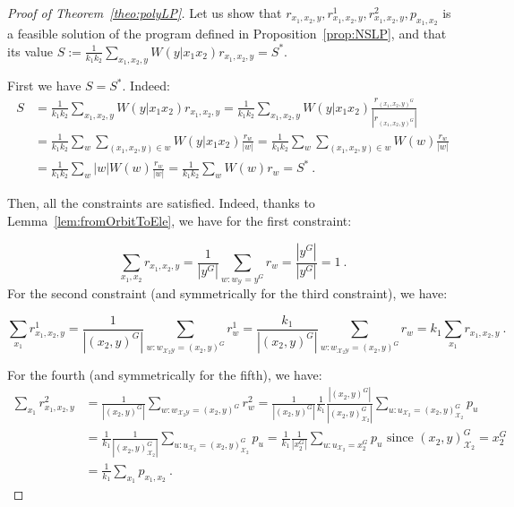 \documentclass[11pt]{article}
\theoremstyle{definition}
\theoremstyle{remark}
\begin{document}
\begin{proof}[Proof of Theorem~\ref{theo:polyLP}]
  Let us show that $r_{x_1,x_2,y},r^1_{x_1,x_2,y},r^2_{x_1,x_2,y},p_{x_1,x_2}$ is a feasible solution of the program defined in Proposition~\ref{prop:NSLP}, and that its value $S:=\frac{1}{k_1k_2} \sum_{x_1,x_2,y} W(y|x_1x_2)r_{x_1,x_2,y} = S^*$.

  First we have $S = S^*$. Indeed:
   \begin{equation}
     \begin{aligned}
       S &= \frac{1}{k_1k_2}\sum_{x_1,x_2,y} W(y|x_1x_2) r_{x_1,x_2,y} = \frac{1}{k_1k_2}\sum_{x_1,x_2,y} W(y|x_1x_2) \frac{r_{(x_1,x_2,y)^G}}{|r_{(x_1,x_2,y)^G}|}\\
       &= \frac{1}{k_1k_2}\sum_{w} \sum_{(x_1,x_2,y) \in w} W(y|x_1x_2) \frac{r_w}{|w|} = \frac{1}{k_1k_2}\sum_{w} \sum_{(x_1,x_2,y) \in w} W(w) \frac{r_w}{|w|}\\
       &= \frac{1}{k_1k_2}\sum_{w} |w| W(w) \frac{r_w}{|w|} = \frac{1}{k_1k_2}\sum_{w} W(w)r_w = S^* \ .
     \end{aligned}
  \end{equation}

   Then, all the constraints are satisfied. Indeed, thanks to Lemma~\ref{lem:fromOrbitToEle}, we have for the first constraint:
   
   \[\sum_{x_1,x_2} r_{x_1,x_2,y} = \frac{1}{|y^G|} \sum_{w:w_{\mathcal{Y}}=y^G} r_w = \frac{|y^G|}{|y^G|} = 1 \ .\]
   For the second constraint (and symmetrically for the third constraint), we have:

   \[\sum_{x_1} r^1_{x_1,x_2,y} = \frac{1}{|(x_2,y)^G|} \sum_{w:w_{\mathcal{X}_2\mathcal{Y}}=(x_2,y)^G} r^1_w = \frac{k_1}{|(x_2,y)^G|}\sum_{w:w_{\mathcal{X}_2\mathcal{Y}}=(x_2,y)^G} r_w = k_1 \sum_{x_1} r_{x_1,x_2,y} \ .\]

   For the fourth (and symmetrically for the fifth), we have:
   \begin{equation}
     \begin{aligned}
       \sum_{x_1} r^2_{x_1,x_2,y} &= \frac{1}{|(x_2,y)^G|} \sum_{w:w_{\mathcal{X}_2\mathcal{Y}}=(x_2,y)^G} r^2_w = \frac{1}{|(x_2,y)^G|} \frac{1}{k_1}\frac{|(x_2,y)^G|}{|(x_2,y)^G_{\mathcal{X}_2}|} \sum_{u:u_{\mathcal{X}_2}=(x_2,y)^G_{\mathcal{X}_2}} p_u \\
       &= \frac{1}{k_1}\frac{1}{|(x_2,y)^G_{\mathcal{X}_2}|} \sum_{u:u_{\mathcal{X}_2}=(x_2,y)^G_{\mathcal{X}_2}} p_u = \frac{1}{k_1} \frac{1}{|x_2^G|}\sum_{u:u_{\mathcal{X}_2}=x_2^G} p_u \text{ since $(x_2,y)^G_{\mathcal{X}_2} = x_2^{G}$}\\
       &= \frac{1}{k_1} \sum_{x_1} p_{x_1,x_2} \ .
     \end{aligned}
   \end{equation}
   

\end{proof}
\end{document}
